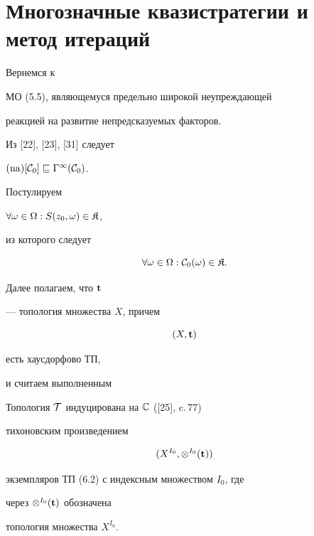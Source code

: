 \section{Многозначные квазистратегии и метод итераций}





Вернемся к


МО (5.5), являющемуся предельно широкой неупреждающей


реакцией на развитие непредсказуемых факторов.


Из [22], [23], [31] следует


$(\operatorname{na})[{\cal C}_0] \sqsubseteq {{\Gamma}^\infty}({\cal C}_0)$.


Постулируем





\begin{conds}


$\forall{\omega} \in \Omega:S({z_0},\omega) \in {\frak K}$,


\end{conds}





\noindent{}из которого следует


\begin{equation}


\fo{\omega} \in \Om:{{\cal C}_0}(\omega) \in {\frak K}.


\end{equation}


Далее полагаем, что ${\bold t}$


--- топология множества $X$, причем


\begin{equation}


(X,{\bold t})


\end{equation}


есть хаусдорфово ТП,


и считаем выполненным





\begin{conds}


Топология ${\cal T}$ индуцирована на ${\Bbb C}$ ([25], c.\,77)


тихоновским произведением


\begin{equation}


({X^{I_0}},{{\otimes}^{I_0}}({\bold t}))


\end{equation}


экземпляров ТП (6.2) с индексным множеством $I_0$, где


через ${{\otimes}^{I_0}}({\bold t})$ обозначена


топология множества $X^{I_0}$.


\end{conds}





